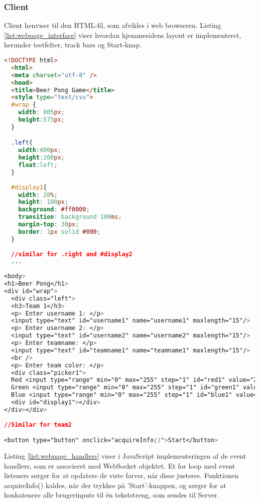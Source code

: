 \documentclass[Softwaredesign/Softwaredesign_main.tex]{subfiles}
\begin{document}
\subsubsection{Client}
Client henviser til den HTML-fil, som afvikles i web browseren. Listing \ref{list:webpage_interface} viser hvordan hjemmesidens layout er implementeret, herunder testfelter, track bars og Start-knap.
\begin{lstlisting}[language=HTML, caption={WebPage interface layout}, label=list:webpage_interface]
<!DOCTYPE html>
  <html>
  <meta charset="utf-8" />
  <head>
  <title>Beer Pong Game</title>
  <style type="text/css">
  #wrap {
    width: 805px;
    height:575px;
  }

  .left{
    width:400px;
    height:200px;
    float:left;
  }
  
  #display1{
    width: 28%;
    height: 100px;
    background: #ff0000;
    transition: background 100ms;
    margin-top: 30px;
    border: 1px solid #000;
  }
  
  //similar for .right and #display2
  ...
  
<body>
<h1>Beer Pong</h1>
<div id="wrap">
  <div class="left">
  <h3>Team 1</h3>
  <p> Enter username 1: </p>
  <input type="text" id="username1" name="username1" maxlength="15"/>
  <p> Enter username 2: </p>
  <input type="text" id="username2" name="username2" maxlength="15"/>
  <p> Enter teamname: </p>
  <input type="text" id="teamname1" name="teamname1" maxlength="15"/>
  <br />
  <p> Enter team color: </p>
  <div class="picker1">
  Red <input type="range" min="0" max="255" step="1" id="red1" value="255">
  Green <input type="range" min="0" max="255" step="1" id="green1" value="0">
  Blue <input type="range" min="0" max="255" step="1" id="blue1" value="0">
  <div id="display1"></div>
</div></div>
 
//Similar for team2 

<button type="button" onclick="acquireInfo()">Start</button>
\end{lstlisting}

Listing \ref{list:webpage_handlers} viser i JavaScript implementeringen af de event handlers, som er associeret med WebSocket objektet. Et for loop med event listeners sørger for at opdatere de viste farver, når disse justeres. Funktionen acquireInfo() kaldes, når der trykkes på 'Start'-knappen, og sørger for at konkatenere alle brugerinputs til én tekststreng, som sendes til Server. 
\end{document}
